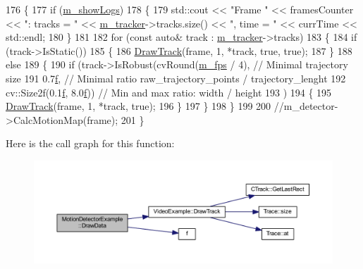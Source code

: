 \begin{DoxyCode}
176     \{
177         \textcolor{keywordflow}{if} (\mbox{\hyperlink{class_video_example_af3bfe51e3e1452bb084016602c668463}{m\_showLogs}})
178         \{
179             std::cout << \textcolor{stringliteral}{"Frame "} << framesCounter << \textcolor{stringliteral}{": tracks = "} << \mbox{\hyperlink{class_video_example_a7c58cd8c883981b2e645d1a3d8edf76a}{m\_tracker}}->tracks.size() <<
       \textcolor{stringliteral}{", time = "} << currTime << std::endl;
180         \}
181 
182         \textcolor{keywordflow}{for} (\textcolor{keyword}{const} \textcolor{keyword}{auto}& track : \mbox{\hyperlink{class_video_example_a7c58cd8c883981b2e645d1a3d8edf76a}{m\_tracker}}->tracks)
183         \{
184             \textcolor{keywordflow}{if} (track->IsStatic())
185             \{
186                 \mbox{\hyperlink{class_video_example_a84a040bc87b915c5ee18c5d11235f40c}{DrawTrack}}(frame, 1, *track, \textcolor{keyword}{true}, \textcolor{keyword}{true});
187             \}
188             \textcolor{keywordflow}{else}
189             \{
190                 \textcolor{keywordflow}{if} (track->IsRobust(cvRound(\mbox{\hyperlink{class_video_example_ae8110012f8d57f39d6355377cf20fb27}{m\_fps}} / 4),          \textcolor{comment}{// Minimal trajectory size}
191                                     0.7\mbox{\hyperlink{rings_8cpp_a77369fc4d5326a16d2c603e032023528}{f}},                        \textcolor{comment}{// Minimal ratio raw\_trajectory\_points /
       trajectory\_lenght}
192                                     cv::Size2f(0.1\mbox{\hyperlink{rings_8cpp_a77369fc4d5326a16d2c603e032023528}{f}}, 8.0\mbox{\hyperlink{rings_8cpp_a77369fc4d5326a16d2c603e032023528}{f}}))      \textcolor{comment}{// Min and max ratio: width / height}
193                         )
194                 \{
195                     \mbox{\hyperlink{class_video_example_a84a040bc87b915c5ee18c5d11235f40c}{DrawTrack}}(frame, 1, *track, \textcolor{keyword}{true});
196                 \}
197             \}
198         \}
199 
200         \textcolor{comment}{//m\_detector->CalcMotionMap(frame);}
201     \}
\end{DoxyCode}
Here is the call graph for this function\+:\nopagebreak
\begin{figure}[H]
\begin{center}
\leavevmode
\includegraphics[width=350pt]{class_motion_detector_example_ad4036841b235fd67dfa45b1fc376e09c_cgraph}
\end{center}
\end{figure}
\mbox{\label{class_video_example_a84a040bc87b915c5ee18c5d11235f40c}} 
